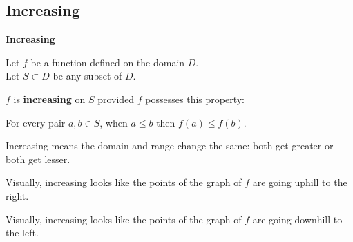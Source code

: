 \documentclass{ximera}
\begin{document}
\subsection*{Increasing}



\begin{definition} \textbf{\textcolor{green!50!black}{Increasing}} 


Let $f$ be a function defined on the domain $D$. \\
Let $S \subset D$ be any subset of $D$.

$f$ is \textbf{increasing} on $S$ provided $f$ possesses this property:  


\begin{center}
For every pair $a, b \in S$, when $a \leq b$ then $f(a) \leq f(b)$.
\end{center}

\end{definition}




\begin{idea}
Increasing means the domain and range change the same: both get greater or both get lesser.
\end{idea}



\begin{observation}
Visually, increasing looks like the points of the graph of $f$ are going uphill to the right.
\end{observation}


\begin{observation}
Visually, increasing looks like the points of the graph of $f$ are going downhill to the left.
\end{observation}
\end{document}
